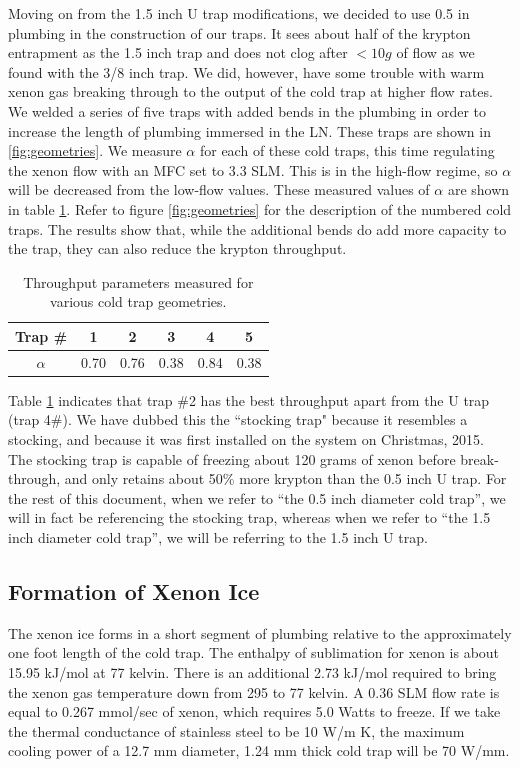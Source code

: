 Moving on from the 1.5 inch U trap modifications, we decided to use 0.5 in plumbing in the construction of our traps. It sees about half of the krypton entrapment as the 1.5 inch trap and does not clog after $<10g$ of flow as we found with the 3/8 inch trap. We did, however, have some trouble with warm xenon gas breaking through to the output of the cold trap at higher flow rates. We welded a series of five traps with added bends in the plumbing in order to increase the length of plumbing immersed in the LN. These traps are shown in \ref{fig:geometries}. We measure $\alpha$ for each of these cold traps, this time regulating the xenon flow with an MFC set to 3.3 SLM. This is in the high-flow regime, so $\alpha$ will be decreased from the low-flow values. These measured values of $\alpha$ are shown in table \ref{tab:geo}. Refer to figure \ref{fig:geometries} for the description of the numbered cold traps. The results show that, while the additional bends do add more capacity to the trap, they can also reduce the krypton throughput.
\begin{table}
 \centering
 \begin{tabular}{c || c c c c c}
 \hline
 \hline
 Trap \# & 1 & 2 & 3 & 4 & 5 \\ [0.5ex] 
 \hline\hline
 $\alpha$ & 0.70 & 0.76 & 0.38 & 0.84 & 0.38 \\ [1ex] 
\hline
\end{tabular}
\caption{Throughput parameters measured for various cold trap geometries.}
\label{tab:geo}
\end{table}

Table \ref{tab:geo} indicates that trap \#2 has the best throughput apart from the U trap (trap 4\#). We have dubbed this the ``stocking trap" because it resembles a stocking, and because it was first installed on the system on Christmas, 2015. The stocking trap is capable of freezing about 120 grams of xenon before break-through, and only retains about 50\% more krypton than the 0.5 inch U trap. For the rest of this document, when we refer to ``the 0.5 inch diameter cold trap'', we will in fact be referencing the stocking trap, whereas when we refer to ``the 1.5 inch diameter cold trap'', we will be referring to the 1.5 inch U trap.


\subsection{Formation of Xenon Ice}
\label{sec:iceform}
The xenon ice forms in a short segment of plumbing relative to the approximately one foot length of the cold trap. The enthalpy of sublimation for xenon is about 15.95 kJ/mol at 77 kelvin\cite{vaporpressure}. There is an additional 2.73 kJ/mol required to bring the xenon gas temperature down from 295 to 77 kelvin. A 0.36 SLM flow rate is equal to 0.267 mmol/sec of xenon, which requires 5.0 Watts to freeze. If we take the thermal conductance of stainless steel to be 10 W/m K, the maximum cooling power of a 12.7 mm diameter, 1.24 mm thick cold trap will be 70 W/mm. 

